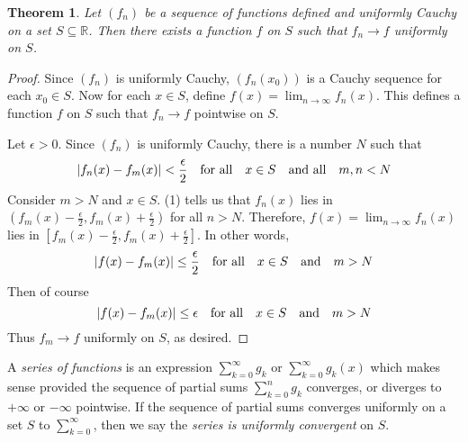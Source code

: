 \documentclass[12pt, lettersize]{book}
\theoremstyle{plain}
\newtheorem{thm}{Theorem}[section]
\theoremstyle{definition}
\theoremstyle{remark}
\newcommand{\R}{\mathbb{R}}
\begin{document}
			\setcounter{equation}{0}
			\begin{thm}\label{thm:25.4}
			Let $(f_n)$ be a sequence of functions defined and uniformly Cauchy on a set $S\subseteq\R$. Then there exists a function $f$ on $S$ such that $f_n\rightarrow f$ uniformly on $S$.
			\end{thm}
			\begin{proof}
			Since $(f_n)$ is uniformly Cauchy, $(f_n(x_0))$ is a Cauchy sequence for each $x_0\in S$. Now for each $x\in S$, define $f(x)=\lim_{n\rightarrow\infty}f_n(x)$. This defines a function $f$ on $S$ such that $f_n\rightarrow f$ pointwise on $S$.
			
			Let $\epsilon>0$. Since $(f_n)$ is uniformly Cauchy, there is a number $N$ such that 
			\begin{equation}
				\abs{f_n(x)-f_m(x)}<\frac{\epsilon}{2}\quad\text{for all}\quad x\in S\quad\text{and all}\quad m,n<N
			\end{equation}
			Consider $m>N$ and $x\in S$. (1) tells us that $f_n(x)$ lies in $(f_m(x)-\frac{\epsilon}{2},f_m(x)+\frac{\epsilon}{2})$ for all $n>N$. Therefore, $f(x)=\lim_{n\rightarrow \infty}f_n(x)$ lies in $[f_m(x)-\frac{\epsilon}{2},f_m(x)+\frac{\epsilon}{2}]$. In other words,
			\begin{displaymath}
				\abs{f(x)-f_m(x)}\leq\frac{\epsilon}{2}\quad\text{for all}\quad x\in S\quad\text{and}\quad m>N
			\end{displaymath}
			Then of course
			\begin{displaymath}
				\abs{f(x)-f_m(x)}\leq\epsilon\quad\text{for all}\quad x\in S\quad\text{and}\quad m>N
			\end{displaymath}
			Thus $f_m\rightarrow f$ uniformly on $S$, as desired.
			\end{proof}
			
			A \emph{series of functions} is an expression $\sum_{k=0}^{\infty}g_k$ or $\sum_{k=0}^{\infty}g_k(x)$ which makes sense provided the sequence of partial sums $\sum_{k=0}^{n}g_k$ converges, or diverges to $+\infty$ or $-\infty$ pointwise. If the sequence of partial sums converges uniformly on a set $S$ to $\sum_{k=0}^{\infty}$, then we say the \emph{series is uniformly convergent} on $S$.
			
\end{document}
